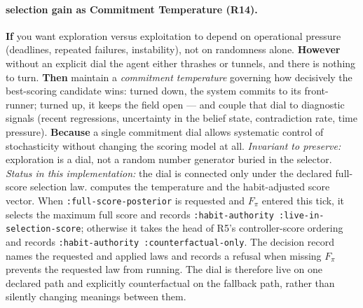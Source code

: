 \hypertarget{pat-r14}{}\paragraph{selection gain as Commitment Temperature (R14).}\label{pat:r14} \textbf{If} you want exploration versus exploitation to depend on operational pressure (deadlines, repeated failures, instability), not on randomness alone. \textbf{However} without an explicit dial the agent either thrashes or tunnels, and there is nothing to turn. \textbf{Then} maintain a \emph{commitment temperature} governing how decisively the best-scoring candidate wins: turned down, the system commits to its front-runner; turned up, it keeps the field open --- and couple that dial to diagnostic signals (recent regressions, uncertainty in the belief state, contradiction rate, time pressure). \textbf{Because} a single commitment dial allows systematic control of stochasticity without changing the scoring model at all.  \emph{Invariant to preserve:} exploration is a dial, not a random number generator buried in the selector.  \emph{Status in this implementation:} the dial is connected only under the declared full-score selection law.  computes the temperature and the habit-adjusted score vector. When \texttt{:full-score-posterior} is requested and $F_\pi$ entered this tick, it selects the maximum full score and records \texttt{:habit-authority :live-in-selection-score}; otherwise it takes the head of R5's controller-score ordering and records \texttt{:habit-authority :counterfactual-only}. The decision record names the requested and applied laws and records a refusal when missing $F_\pi$ prevents the requested law from running. The dial is therefore live on one declared path and explicitly counterfactual on the fallback path, rather than silently changing meanings between them.

